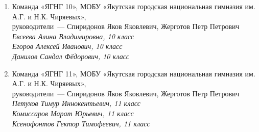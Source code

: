 \begin{enumerate}
\item Команда «ЯГНГ 10», МОБУ «Якутская городская национальная гимназия им. А.Г. и Н.К. Чиряевых», \\
руководители~— Спиридонов Яков Яковлевич, Жерготов Петр Петрович \\
\it
\indent Евсеева Алина Владимировна, 10 класс \\
\indent Егоров Алексей Иванович, 10 класс \\
\indent Данилов Сандал Фёдорович, 10 класс
\rm

\item Команда «ЯГНГ 11», МОБУ «Якутская городская национальная гимназия им. А.Г. и Н.К. Чиряевых», \\
руководители~— Спиридонов Яков Яковлевич, Жерготов Петр Петрович \\
\it
\indent Петухов Тимур Иннокентьевич, 11 класс \\
\indent Комиссаров Марат Юрьевич, 11 класс \\
\indent Ксенофонтов Гектор Тимофеевич, 11 класс
\rm
\end{enumerate}